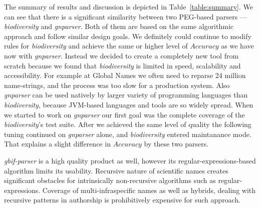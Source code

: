 \documentclass{bmcart}
\begin{document}
The summary of results and discussion is depicted in Table~\ref{table:summary}. We can see that there is a significant similarity between two PEG-based parsers --- \textit{biodiversity} and \textit{gnparser}. Both of them are based on the same algorithmic approach and follow similar design goals. We definitely could continue to modify rules for \textit{biodiversity} and achieve the same or higher level of $Accuracy$ as we have now with \textit{gnparser}. Instead we decided to create a completely new tool from scratch because we found that \textit{biodiversity} is limited in speed, scalability and accessibility. For example at Global Names we often need to reparse 24 million name-strings, and the process was too slow for a production system. Also \textit{gnparser} can be used natively by larger variety of programming languages than \textit{biodiversity}, because JVM-based languages and tools are so widely spread. When we started to work on \textit{gnparser} our first goal was the complete coverage of the \textit{biodiversity}'s test suite. After we achieved the same level of quality the following tuning continued on \textit{gnparser} alone, and \textit{biodiversity} entered maintanance mode. That explains a slight difference in $Accuracy$ by these two parsers.

\textit{gbif-parser} is a high quality product as well, however its regular-expressions-based algorithm limits its usability. Recursive nature of scientific names creates significant obstacles for intrinsically non-recursive algorithms such as regular-expressions. Coverage of multi-infraspecific names as well as hybrids, dealing with recursive patterns in authorship is prohibitively expensive for such approach.
\end{document}
